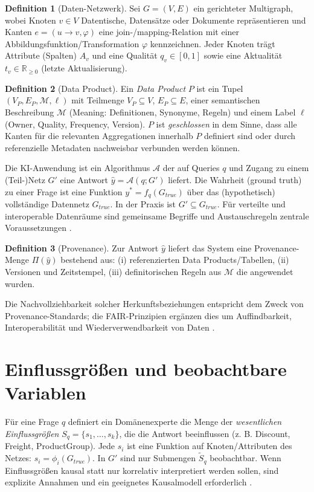 \documentclass[a4paper,12pt,twoside]{report}
\theoremstyle{definition}
\newtheorem{definition}{Definition}[chapter]
\newcommand{\RR}{\mathbb{R}}
\begin{document}
\begin{definition}[Daten-Netzwerk]
Sei $G=(V,E)$ ein gerichteter Multigraph, wobei Knoten $v\in V$ Datentische, Datensätze oder Dokumente repräsentieren und Kanten $e=(u\to v,\varphi)$ eine join-/mapping-Relation mit einer Abbildungsfunktion/Transformation $\varphi$ kennzeichnen. Jeder Knoten trägt Attribute (Spalten) $A_v$ und eine Qualität $q_v\in[0,1]$ sowie eine Aktualität $t_v\in\RR_{\ge0}$ (letzte Aktualisierung).
\end{definition}

\begin{definition}[Data Product]
Ein \emph{Data Product} $P$ ist ein Tupel $(V_P,E_P,\mathcal M,\ell)$ mit Teilmenge $V_P\subseteq V$, $E_P\subseteq E$, einer semantischen Beschreibung $\mathcal M$ (Meaning: Definitionen, Synonyme, Regeln) und einem Label $\ell$ (Owner, Quality, Frequency, Version). $P$ ist \emph{geschlossen} in dem Sinne, dass alle Kanten für die relevanten Aggregationen innerhalb $P$ definiert sind oder durch referenzielle Metadaten nachweisbar verbunden werden können.
\end{definition}

Die KI-Anwendung ist ein Algorithmus $\mathcal A$ der auf Queries $q$ und Zugang zu einem (Teil-)Netz $G'$ eine Antwort $\hat y=\mathcal A(q;G')$ liefert. Die Wahrheit (ground truth) zu einer Frage ist eine Funktion $y^*=f_q(G_{true})$ über das (hypothetisch) vollständige Datennetz $G_{true}$. In der Praxis ist $G'\subseteq G_{true}$. Für verteilte und interoperable Datenräume sind gemeinsame Begriffe und Austauschregeln zentrale Voraussetzungen \cite{nistbdif19,ottojarke19}.

\begin{definition}[Provenance]
Zur Antwort $\hat y$ liefert das System eine Provenance-Menge $\Pi(\hat y)$ bestehend aus: (i) referenzierten Data Products/Tabellen, (ii) Versionen und Zeitstempel, (iii) definitorischen Regeln aus $\mathcal M$ die angewendet wurden.
\end{definition}
Die Nachvollziehbarkeit solcher Herkunftsbeziehungen entspricht dem Zweck von Provenance-Standards; die FAIR-Prinzipien ergänzen dies um Auffindbarkeit, Interoperabilität und Wiederverwendbarkeit von Daten \cite{provo13,fair16,datasheets21}.

\section{Einflussgrößen und beobachtbare Variablen}
Für eine Frage $q$ definiert ein Domänenexperte die Menge der \emph{wesentlichen Einflussgrößen} $S_q=\{s_1,\dots,s_k\}$, die die Antwort beeinflussen (z. B. Discount, Freight, ProductGroup). Jede $s_i$ ist eine Funktion auf Knoten/Attributen des Netzes: $s_i=\phi_i(G_{true})$. In $G'$ sind nur Submengen $\tilde S_q$ beobachtbar.
Wenn Einflussgrößen kausal statt nur korrelativ interpretiert werden sollen, sind explizite Annahmen und ein geeignetes Kausalmodell erforderlich \cite{pearl09,hernan20}.
\end{document}
